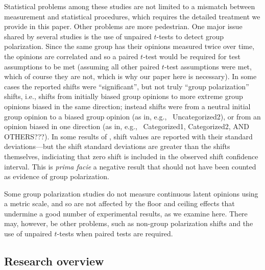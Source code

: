 \documentclass[12pt, letterpaper]{article}
\begin{document}
Statistical problems among these studies are not limited to a mismatch between
measurement and statistical procedures, which requires the detailed treatment
we provide in this paper. Other problems are more pedestrian.
One major issue shared by several studies
is the use of unpaired $t$-tests to detect group polarization. Since the same
group has their opinions measured twice over time, the opinions are correlated
and so a paired $t$-test would be required for test assumptions to be met 
(assuming all other paired $t$-test assumptions were met, 
which of course they are not, which is why our paper here is necessary).
In some cases the reported shifts were ``significant'', 
but not truly ``group polarization'' shifts, i.e., 
shifts from initially biased group opinions
to more extreme group opinions biased in the same direction; instead shifts 
were from a neutral initial group opinion to a biased group opinion 
(as in, e.g.,~ Uncategorized2), or from
an opinion biased in one direction (as in, e.g.,~ Categorized1,
Categorized2, AND OTHERS???). In some results of , 
shift values are reported with their
standard deviations---but the shift standard deviations are greater than the
shifts themselves, indiciating that zero shift is included in the observed
shift confidence interval. This is \emph{prima facie} a negative result that
should not have been counted as evidence of group polarization. 

Some group polarization studies do not measure continuous latent opinions using
a metric scale, and so are not affected by the floor and ceiling effects that
undermine a good number of experimental results, as we examine here. There may,
however, be other problems, such as non-group polarization shifts and the use
of unpaired $t$-tests when paired tests are required.

\subsection{Research overview}
\end{document}
